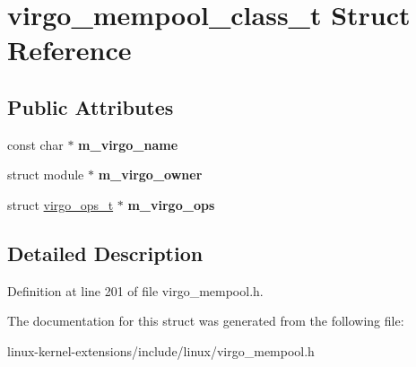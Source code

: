\hypertarget{structvirgo__mempool__class__t}{\section{virgo\-\_\-mempool\-\_\-class\-\_\-t Struct Reference}
\label{structvirgo__mempool__class__t}
}
\subsection*{Public Attributes}
\begin{DoxyCompactItemize}
\item 
\hypertarget{structvirgo__mempool__class__t_ab0039045d5f51b00bc8fecbc75869bf3}{const char $\ast$ {\bfseries m\-\_\-virgo\-\_\-name}}\label{structvirgo__mempool__class__t_ab0039045d5f51b00bc8fecbc75869bf3}

\item 
\hypertarget{structvirgo__mempool__class__t_a967cff16c460639bb0a051e16644e3e5}{struct module $\ast$ {\bfseries m\-\_\-virgo\-\_\-owner}}\label{structvirgo__mempool__class__t_a967cff16c460639bb0a051e16644e3e5}

\item 
\hypertarget{structvirgo__mempool__class__t_a3363917b152d9fbc5ab2c290dc29ed6d}{struct \hyperlink{structvirgo__ops__t}{virgo\-\_\-ops\-\_\-t} $\ast$ {\bfseries m\-\_\-virgo\-\_\-ops}}\label{structvirgo__mempool__class__t_a3363917b152d9fbc5ab2c290dc29ed6d}

\end{DoxyCompactItemize}


\subsection{Detailed Description}


Definition at line 201 of file virgo\-\_\-mempool.\-h.



The documentation for this struct was generated from the following file\-:\begin{DoxyCompactItemize}
\item 
linux-\/kernel-\/extensions/include/linux/virgo\-\_\-mempool.\-h\end{DoxyCompactItemize}
